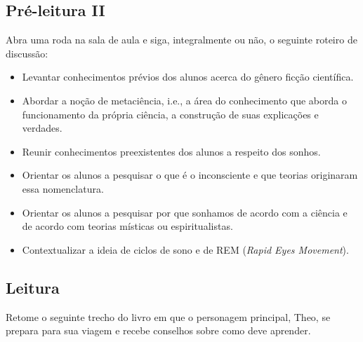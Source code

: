 \documentclass[12pt]{extarticle}
\begin{document}
\subsection{Pré-leitura II}
Abra uma roda na sala de aula e siga, integralmente ou não, o seguinte roteiro de discussão:

\begin{itemize}
\item Levantar conhecimentos prévios dos alunos acerca do gênero ficção
científica.

\item Abordar a noção de metaciência, i.e., a área do conhecimento que aborda o
funcionamento da própria ciência, a construção de suas explicações e verdades.

\item Reunir conhecimentos preexistentes dos alunos a respeito dos sonhos.

\item Orientar os alunos a pesquisar o que é o inconsciente e que teorias
originaram essa nomenclatura.

\item Orientar os alunos a pesquisar por que sonhamos de acordo com a ciência e de
acordo com teorias místicas ou espiritualistas.

\item Contextualizar a ideia de ciclos de sono e de REM (\textit{Rapid Eyes Movement}).
\end{itemize}

\subsection{Leitura}


Retome o seguinte trecho do livro em que o personagem principal, Theo, se
prepara para sua viagem e recebe conselhos sobre como deve aprender.  
\end{document}
